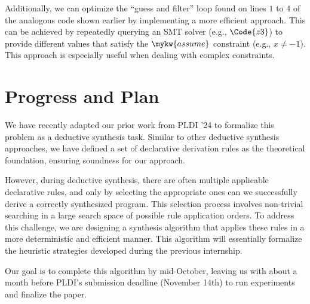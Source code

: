 Additionally, we can optimize the ``guess and filter'' loop found on
lines $1$ to $4$ of the analogous  code shown earlier by
implementing a more efficient approach. This can be achieved by
repeatedly querying an SMT solver (e.g., $\Code{z3}$) to provide
different values that satisfy the $\mykw{assume}$ constraint (e.g., $x
\not= -1$). This approach is especially useful when dealing with
complex constraints.

\section{Progress and Plan}

We have recently adapted our prior work from PLDI '24 to formalize
this problem as a deductive synthesis task. Similar to other deductive
synthesis approaches, we have defined a set of declarative derivation
rules as the theoretical foundation, ensuring soundness for our
approach.

However, during deductive synthesis, there are often multiple
applicable declarative rules, and only by selecting the appropriate
ones can we successfully derive a correctly synthesized program. This
selection process involves non-trivial searching in a large search
space of possible rule application orders. To address this challenge,
we are designing a synthesis algorithm that applies these rules in a
more deterministic and efficient manner. This algorithm will
essentially formalize the heuristic strategies developed during the
previous internship.

Our goal is to complete this algorithm by mid-October, leaving us with
about a month before PLDI's submission deadline (November 14th) to run
experiments and finalize the paper.
